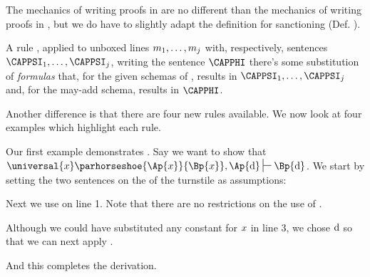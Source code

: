 The mechanics of writing proofs in \GQD{} are no different than the mechanics of writing proofs in \GSD{}, but we do have to slightly adapt the definition for sanctioning (Def. ).
\begin{majorILnc}{}
A rule , applied to unboxed lines $m_1,\ldots,m_{j}$ with, respectively, sentences $\CAPPSI_1,\ldots,\CAPPSI_{\integer{j}}$,  writing the sentence $\CAPPHI$ \Iff there's some substitution of \GQL{} \emph{formulas} that, for the given schemas of , results in $\CAPPSI_1,\ldots,\CAPPSI_{\integer{j}}$ and, for the may-add schema, results in $\CAPPHI$. 
\end{majorILnc}
Another difference is that there are four new rules available. 
We now look at four examples which highlight each rule.

Our first example demonstrates . 
Say we want to show that $\universal{\variable{x}}\parhorseshoe{\Ap{\variable{x}}}{\Bp{\variable{x}}},\Ap{\constant{d}}\sststile{}{}\Bp{\constant{d}}$.
We start by setting the two sentences on the  of the turnstile as assumptions:
\begin{gproof}[\label{GQDExampleA}]
\end{gproof}
Next we use  on line 1. 
Note that there are no restrictions on the use of .
\begin{gproof}[\label{GQDExampleB}]
\end{gproof}
Although we could have substituted any constant for $x$ in line 3, we chose $\mathrm{d}$ so that we can next apply . 
\begin{gproof}[\label{GQDExampleC}]
\end{gproof}
And this completes the derivation. 

